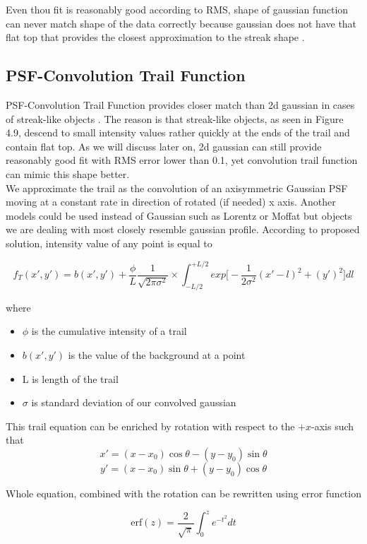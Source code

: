\documentclass[12pt, a4paper, oneside]{book}
\begin{document}
Even thou fit is reasonably good according to RMS, shape of gaussian function can never match shape of the data correctly because gaussian does not have that flat top that provides the closest approximation to the streak shape \cite{stovaken}.

\subsection{PSF-Convolution Trail Function}
PSF-Convolution Trail Function provides closer match than 2d gaussian in cases of streak-like objects \cite{veres}.
The reason is that streak-like objects, as seen in Figure 4.9, descend to small intensity values rather quickly at the ends of the trail and contain flat top.
As we will discuss later on, 2d gaussian can still provide reasonably good fit with RMS error lower than 0.1, yet convolution trail function can mimic this shape better.
\\
We approximate the trail as the convolution of an axisymmetric Gaussian PSF moving at a constant rate in direction of rotated (if needed) x axis.
Another models could be used instead of Gaussian such as Lorentz or Moffat but objects we are dealing with most closely resemble gaussian profile.
According to proposed solution, intensity value of any point is equal to

$$f_T(x',y') = b(x',y') + \frac{\phi}{L} \frac{1}{\sqrt{2\pi\sigma^2}} \times \int_{-L/2}^{+L/2} exp\bigg[-\frac{1}{2\sigma^2}{(x'-l)^2 + (y')^2}\bigg] dl$$

where

\begin{itemize}
    \item $\phi$ is the cumulative intensity of a trail
    \item $b(x',y')$ is the value of the background at a point
    \item L is length of the trail
    \item $\sigma$ is standard deviation of our convolved gaussian
\end{itemize}

This trail equation can be enriched by rotation with respect to the $+x$-axis such that
$$x'=(x-x_0)\cos{\theta} - (y-y_0)\sin{\theta}$$
$$y'=(x-x_0)\sin{\theta} + (y-y_0)\cos{\theta}$$

Whole equation, combined with the rotation can be rewritten using error function

$$ \text{erf}(z) = \frac{2}{\sqrt{\pi}} \int_{0}^{z}e^{-t^2} dt$$
\end{document}
